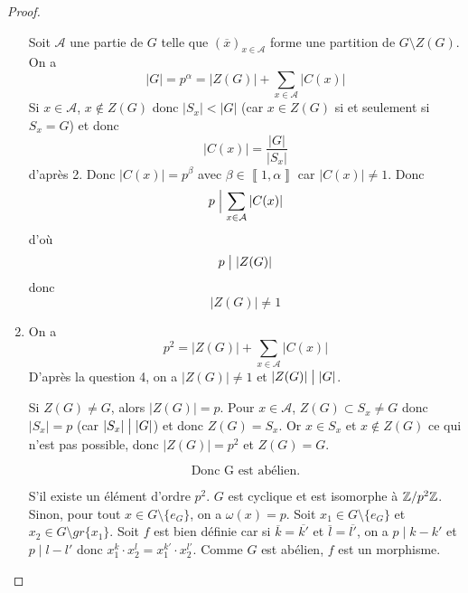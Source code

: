 \documentclass[12pt]{article}
\begin{document}
\begin{proof}
\begin{enumerate}
		Soit $\mathcal{A}$ une partie de $G$ telle que $(\overline{x})_{x\in\mathcal{A}}$ forme une partition de $G\setminus Z(G)$. On a 
		\begin{equation}
			\vert G\vert=p^{\alpha}=\vert Z(G)\vert+\sum_{x\in\mathcal{A}}\vert C(x)\vert
		\end{equation}
		Si $x\in\mathcal{A}$, $x\notin Z(G)$ donc $\vert S_{x}\vert <\vert G\vert$ (car $x\in Z(G)$ si et seulement si $S_{x}=G$) et donc 
		\begin{equation}
			\vert C(x)\vert=\frac{\vert G\vert}{\vert S_{x}\vert}
		\end{equation}
		d'après 2. Donc $\vert C(x)\vert=p^{\beta}$ avec $\beta\in\left\llbracket 1,\alpha\right\rrbracket$ car $\vert C(x)\vert\neq 1$. Donc 
		\begin{equation}
			p\Bigm|\sum_{x\in\mathcal{A}}\vert C(x)\vert
		\end{equation}
		d'où 
		\begin{equation}
			p\bigm|\left\lvert Z(G)\right\rvert
		\end{equation}
		donc 
		\begin{equation}
			\boxed{\left\lvert Z(G)\right\rvert\neq1}
		\end{equation}

		\item On a 
		\begin{equation}
			p^{2}=\vert Z(G)\vert+\sum_{x\in\mathcal{A}}\vert C(x)\vert
		\end{equation}
		D'après la question 4, on a $\vert Z(G)\vert\neq1$ et $\vert Z(G)\vert\bigm|\vert G\vert$.

		Si $Z(G)\neq G$, alors $\vert Z(G)\vert=p$. Pour $x\in\mathcal{A}$, $Z(G)\subset S_{x}\neq G$ donc $\vert S_{x}\vert= p$ (car $\vert S_{x}\vert\bigm|\vert G\vert$) et donc $Z(G)=S_{x}$. Or $x\in S_{x}$ et $x\notin Z(G)$ ce qui n'est pas possible, donc $\vert Z(G)\vert=p^{2}$ et $Z(G)=G$. 
		
		\begin{equation}
			\boxed{\text{Donc G est abélien.}}
		\end{equation}

		S'il existe un élément d'ordre $p^{2}$. $G$ est cyclique et est isomorphe à $\mathbb{Z}/p^{2}\mathbb{Z}$. Sinon, pour tout $x\in G\setminus\{e_{G}\}$, on a $\omega(x)=p$. Soit $x_{1}\in G\setminus\{e_{G}\}$ et $x_{2}\in G\setminus gr\{x_{1}\}$.
		Soit 
		$f$ est bien définie car si $\overline{k}=\overline{k'}$ et $\overline{l}=\overline{l'}$, on a $p\mid k-k'$ et $p\mid l-l'$ donc $x_{1}^{k}\cdot x_{2}^{l}=x_{1}^{k'}\cdot x_{2}^{l'}$. Comme $G$ est abélien, $f$ est un morphisme. 
		

\end{enumerate}
\end{proof}
\end{document}
